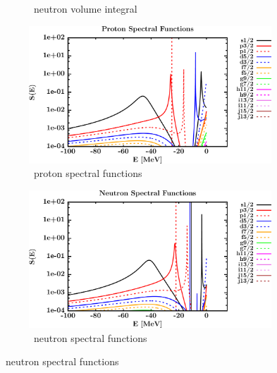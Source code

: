 \begin{figure}[hbtp]
\begin{subfigure}[b]{0.45\textwidth}
        \caption{\oEight\ neutron volume integral}
        \label{DOMFitData_o18_neutron_potentialIntegral}
    \end{subfigure}\vspace{0.3in}
    \begin{subfigure}[b]{0.45\textwidth}
        \centering
        \includegraphics[width=\linewidth]{figures/o18_protonSpectralFunctions.png}
        \caption{\oEight\ proton spectral functions}
        \label{DOMFitData_o18_proton_spectralFunctions}
    \end{subfigure}\hspace{6pt}
    \begin{subfigure}[b]{0.45\textwidth}
        \centering
        \includegraphics[width=\linewidth]{figures/o18_neutronSpectralFunctions.png}
        \caption{\oEight\ neutron spectral functions}
        \label{DOMFitData_o18_neutron_spectralFunctions}
    \end{subfigure}
\end{figure}

\afterpage{\clearpage}

